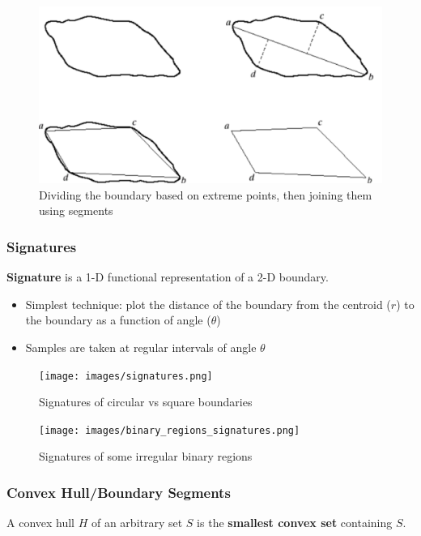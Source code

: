 \begin{figure}[H]
  \centering
  \includegraphics[width=\linewidth]{images/splitting.png}
  \caption{Dividing the boundary based on extreme points, then
  joining them using segments}
\end{figure}

\subsubsection*{Signatures}

\textbf{Signature} is a 1-D functional representation of a 2-D boundary.

\begin{itemize}
  \item Simplest technique: plot the distance of the boundary from
    the centroid ($r$) to the boundary as a function of angle ($\theta$)
  \item Samples are taken at regular intervals of angle $\theta$
\end{itemize}

\begin{figure}[H]
  \centering
  \texttt{[image: images/signatures.png]}
  \caption{Signatures of circular vs square boundaries}
\end{figure}

\begin{figure}[H]
  \centering
  \texttt{[image: images/binary\_regions\_signatures.png]}
  \caption{Signatures of some irregular binary regions}
\end{figure}

\subsubsection*{Convex Hull/Boundary Segments}

A convex hull $H$ of an arbitrary set $S$ is the \textbf{smallest
convex set} containing $S$.

